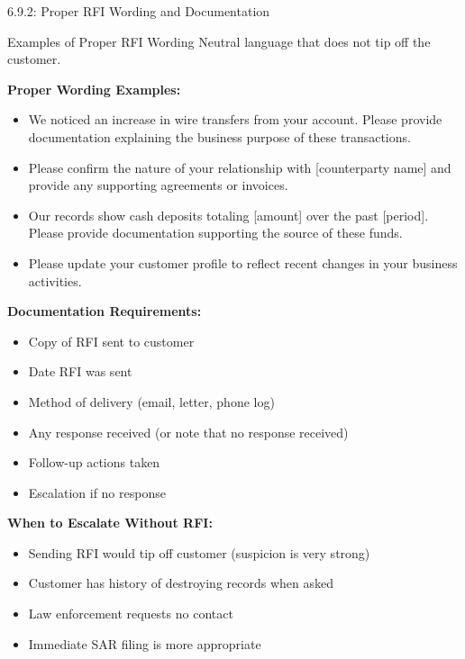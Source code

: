 \documentclass[11pt,a4paper]{beamer}
\begin{document}
\begin{frame}{6.9.2: Proper RFI Wording and Documentation}
	\begin{block}{Examples of Proper RFI Wording}
		Neutral language that does not tip off the customer.
	\end{block}
	\textbf{Proper Wording Examples:}
	\begin{itemize}
		\item We noticed an increase in wire transfers from your account. Please provide documentation explaining the business purpose of these transactions.
		\item Please confirm the nature of your relationship with [counterparty name] and provide any supporting agreements or invoices.
		\item Our records show cash deposits totaling [amount] over the past [period]. Please provide documentation supporting the source of these funds.
		\item Please update your customer profile to reflect recent changes in your business activities.
	\end{itemize}
	\textbf{Documentation Requirements:}
	\begin{itemize}
		\item Copy of RFI sent to customer
		\item Date RFI was sent
		\item Method of delivery (email, letter, phone log)
		\item Any response received (or note that no response received)
		\item Follow-up actions taken
		\item Escalation if no response
	\end{itemize}
	\textbf{When to Escalate Without RFI:}
	\begin{itemize}
		\item Sending RFI would tip off customer (suspicion is very strong)
		\item Customer has history of destroying records when asked
		\item Law enforcement requests no contact
		\item Immediate SAR filing is more appropriate
	\end{itemize}
\end{frame}

\end{document}
